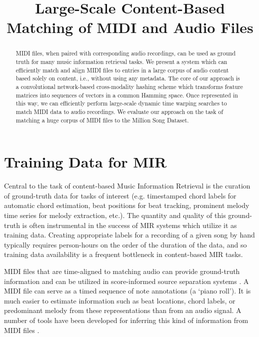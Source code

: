 \documentclass{article}
\title{Large-Scale Content-Based Matching of MIDI and Audio Files}
\begin{document}
\maketitle

\begin{abstract}
  MIDI files, when paired with corresponding audio recordings, can be used as ground truth for many music information retrieval tasks.
  We present a system which can efficiently match and align MIDI files to entries in a large corpus of audio content based solely on content, i.e., without using any metadata.
  The core of our approach is a convolutional network-based cross-modality hashing scheme which transforms feature matrices into sequences of vectors in a common Hamming space.
  Once represented in this way, we can efficiently perform large-scale dynamic time warping searches to match MIDI data to audio recordings.
  We evaluate our approach on the task of matching a huge corpus of MIDI files to the Million Song Dataset.
\end{abstract}

\section{Training Data for MIR}\label{sec:introduction}

Central to the task of content-based Music Information Retrieval is the curation of ground-truth data for tasks of interest (e.g. timestamped chord labels for automatic chord estimation, beat positions for beat tracking, prominent melody time series for melody extraction, etc.).
The quantity and quality of this ground-truth is often instrumental in the success of MIR systems which utilize it as training data.
Creating appropriate labels for a recording of a given song by hand typically requires person-hours on the order of the duration of the data, and so training data availability is a frequent bottleneck in content-based MIR tasks.

MIDI files that are time-aligned to matching audio can provide ground-truth information  \cite{ewert2012towards, turetsky2003ground} and can be utilized in score-informed source separation systems \cite{ewert2014score}.
A MIDI file can serve as a timed sequence of note annotations (a `piano roll').
It is much easier to estimate information such as beat locations, chord labels, or predominant melody from these representations than from an audio signal.
A number of tools have been developed for inferring this kind of information from MIDI files \cite{eerola2004mir,mckay2006jsymbolic,cuthbert2010music21,raffel2014pretty_midi}.
\end{document}
